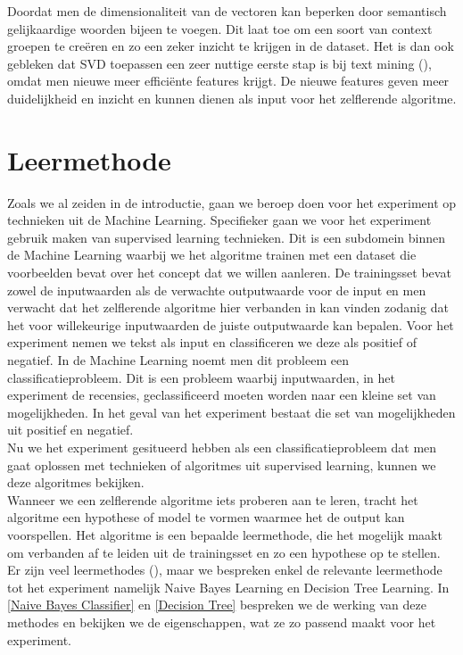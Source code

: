 Doordat men de dimensionaliteit van de vectoren kan beperken door semantisch gelijkaardige woorden bijeen te voegen. Dit laat toe om een soort van context groepen te cre\"eren en zo een zeker inzicht te krijgen in de dataset. Het is dan ook gebleken dat SVD toepassen een zeer nuttige eerste stap is bij text mining (\cite{maas2011learning}), omdat men nieuwe meer effici\"ente features krijgt. De nieuwe features geven meer duidelijkheid en inzicht en kunnen dienen als input voor het zelflerende algoritme.

\section{Leermethode}\label{Leermethode}

Zoals we al zeiden in de introductie, gaan we beroep doen voor het experiment op technieken uit de Machine Learning. Specifieker gaan we voor het experiment gebruik maken van supervised learning technieken.
Dit is een subdomein binnen de Machine Learning waarbij we het algoritme trainen met een dataset die voorbeelden bevat over het concept dat we willen aanleren. De trainingsset bevat zowel de inputwaarden als de verwachte outputwaarde voor de input en men verwacht dat het zelflerende algoritme hier verbanden in kan vinden zodanig dat het voor willekeurige inputwaarden de juiste outputwaarde kan bepalen. Voor het experiment nemen we tekst als input en classificeren we deze als positief of negatief. In de Machine Learning noemt men dit probleem een classificatieprobleem. Dit is een probleem waarbij inputwaarden, in het experiment de recensies, geclassificeerd moeten worden naar een kleine set van mogelijkheden. In het geval van het experiment bestaat die set van mogelijkheden uit positief en negatief.\\
%
Nu we het experiment gesitueerd hebben als een classificatieprobleem dat men gaat oplossen met technieken of algoritmes uit supervised learning, kunnen we deze algoritmes bekijken.\\  
%
Wanneer we een zelflerende algoritme iets proberen aan te leren, tracht het algoritme een hypothese of model te vormen waarmee het de output kan voorspellen. Het algoritme is een bepaalde leermethode, die het mogelijk maakt om verbanden af te leiden uit de trainingsset en zo een hypothese op te stellen.
Er zijn veel leermethodes (\cite{mitchell1997machine}), maar we bespreken enkel de relevante leermethode tot het experiment namelijk Naive Bayes Learning en Decision Tree Learning. In \ref{Naive Bayes Classifier} en \ref{Decision Tree} bespreken we de werking van deze methodes en bekijken we de eigenschappen, wat ze zo passend maakt voor het experiment.  

